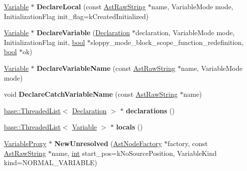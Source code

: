 \begin{DoxyCompactItemize}
\mbox{\hyperlink{classv8_1_1internal_1_1Variable}{Variable}} $\ast$ {\bfseries Declare\+Local} (const \mbox{\hyperlink{classv8_1_1internal_1_1AstRawString}{Ast\+Raw\+String}} $\ast$name, Variable\+Mode mode, Initialization\+Flag init\+\_\+flag=k\+Created\+Initialized)
\item 
\mbox{\label{classv8_1_1internal_1_1Scope_ade3925d41dd4e6816ef854ade5d680a5}} 
\mbox{\hyperlink{classv8_1_1internal_1_1Variable}{Variable}} $\ast$ {\bfseries Declare\+Variable} (\mbox{\hyperlink{classv8_1_1internal_1_1Declaration}{Declaration}} $\ast$declaration, Variable\+Mode mode, Initialization\+Flag init, \mbox{\hyperlink{classbool}{bool}} $\ast$sloppy\+\_\+mode\+\_\+block\+\_\+scope\+\_\+function\+\_\+redefinition, \mbox{\hyperlink{classbool}{bool}} $\ast$ok)
\item 
\mbox{\label{classv8_1_1internal_1_1Scope_ac6842eb4db1b6b9f00fc42df044cb6ad}} 
\mbox{\hyperlink{classv8_1_1internal_1_1Variable}{Variable}} $\ast$ {\bfseries Declare\+Variable\+Name} (const \mbox{\hyperlink{classv8_1_1internal_1_1AstRawString}{Ast\+Raw\+String}} $\ast$name, Variable\+Mode mode)
\item 
\mbox{\label{classv8_1_1internal_1_1Scope_a9b492ff492e2cea7a8b2fcf5e2e941b6}} 
void {\bfseries Declare\+Catch\+Variable\+Name} (const \mbox{\hyperlink{classv8_1_1internal_1_1AstRawString}{Ast\+Raw\+String}} $\ast$name)
\item 
\mbox{\label{classv8_1_1internal_1_1Scope_a452dc63f465e1c24ecbf59a9b69a08e9}} 
\mbox{\hyperlink{classv8_1_1base_1_1ThreadedListBase}{base\+::\+Threaded\+List}}$<$ \mbox{\hyperlink{classv8_1_1internal_1_1Declaration}{Declaration}} $>$ $\ast$ {\bfseries declarations} ()
\item 
\mbox{\label{classv8_1_1internal_1_1Scope_aa2e193c5d0954fcf643ddc19eea1ee86}} 
\mbox{\hyperlink{classv8_1_1base_1_1ThreadedListBase}{base\+::\+Threaded\+List}}$<$ \mbox{\hyperlink{classv8_1_1internal_1_1Variable}{Variable}} $>$ $\ast$ {\bfseries locals} ()
\item 
\mbox{\label{classv8_1_1internal_1_1Scope_a5dc66b1a7fd93c126fda8f5060d1f4d5}} 
\mbox{\hyperlink{classv8_1_1internal_1_1VariableProxy}{Variable\+Proxy}} $\ast$ {\bfseries New\+Unresolved} (\mbox{\hyperlink{classv8_1_1internal_1_1AstNodeFactory}{Ast\+Node\+Factory}} $\ast$factory, const \mbox{\hyperlink{classv8_1_1internal_1_1AstRawString}{Ast\+Raw\+String}} $\ast$name, \mbox{\hyperlink{classint}{int}} start\+\_\+pos=k\+No\+Source\+Position, Variable\+Kind kind=N\+O\+R\+M\+A\+L\+\_\+\+V\+A\+R\+I\+A\+B\+LE)

\end{DoxyCompactItemize}
